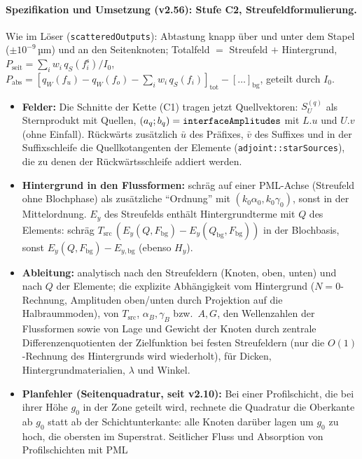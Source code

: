 \paragraph{Spezifikation und Umsetzung (v2.56): Stufe C2, Streufeldformulierung.}
Wie im Löser (\verb|scatteredOutputs|): Abtastung knapp über und unter dem Stapel ($\pm10^{-9}$\,µm) und an den
Seitenknoten; Totalfeld $=$ Streufeld $+$ Hintergrund, $P_{\text{seit}}=\sum_i w_i\,q_S(f^{\text{s}}_i)/I_0$,
$P_{\text{abs}}=[q_W(f_u)-q_W(f_o)-\sum_i w_i\,q_S(f_i)]_{\text{tot}}-[\dots]_{\text{bg}}$, geteilt durch $I_0$.
\begin{itemize}[nosep]
  \item \textbf{Felder:} Die Schnitte der Kette (C1) tragen jetzt Quellvektoren: $S_U^{(q)}$ als Sternprodukt mit
        Quellen, $(a_q;b_q)=\verb|interfaceAmplitudes|$ mit $L.u$ und $U.v$ (ohne Einfall). Rückwärts zusätzlich
        $\bar u$ des Präfixes, $\bar v$ des Suffixes und in der Suffixschleife die Quellkotangenten der Elemente
        (\verb|adjoint::starSources|), die zu denen der Rückwärtsschleife addiert werden.
  \item \textbf{Hintergrund in den Flussformen:} schräg auf einer PML-Achse (Streufeld ohne Blochphase) als zusätzliche
        \enquote{Ordnung} mit $(k_0\alpha_0,k_0\gamma_0)$, sonst in der Mittelordnung. $E_y$ des Streufelds enthält
        Hintergrundterme mit $Q$ des Elements: schräg $T_{\text{src}}\,(E_y(Q,F_{\text{bg}})-E_y(Q_{\text{bg}},F_{\text{bg}}))$
        in der Blochbasis, sonst $E_y(Q,F_{\text{bg}})-E_{y,\text{bg}}$ (ebenso $H_y$).
  \item \textbf{Ableitung:} analytisch nach den Streufeldern (Knoten, oben, unten) und nach $Q$ der Elemente; die explizite
        Abhängigkeit vom Hintergrund ($N=0$-Rechnung, Amplituden oben/unten durch Projektion auf die Halbraummoden), von
        $T_{\text{src}}$, $\alpha_B,\gamma_B$ bzw.\ $A,G$, den Wellenzahlen der Flussformen sowie von Lage und Gewicht der
        Knoten durch zentrale Differenzenquotienten der Zielfunktion bei festen Streufeldern (nur die $O(1)$-Rechnung
        des Hintergrunds wird wiederholt), für Dicken, Hintergrundmaterialien, $\lambda$ und Winkel.
  \item \textbf{Planfehler (Seitenquadratur, seit v2.10):} Bei einer Profilschicht, die bei ihrer Höhe $g_0$ in der Zone
        geteilt wird, rechnete die Quadratur die Oberkante ab $g_0$ statt ab der Schichtunterkante: alle Knoten darüber
        lagen um $g_0$ zu hoch, die obersten im Superstrat. Seitlicher Fluss und Absorption von Profilschichten mit PML

\end{itemize}
